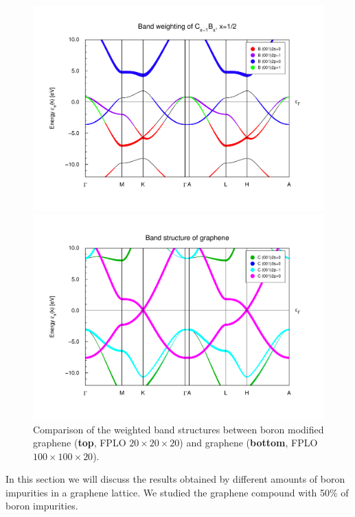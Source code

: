 				\begin{figure}
					\begin{minipage}[t]{\textwidth}
						\includegraphics[width=\textwidth]{Results/Bor/Bor1R/bweights.pdf}
					\end{minipage}
					\begin{minipage}[t]{\textwidth}
						\includegraphics[width=\textwidth]{Results/Graphene/GrapheneNew/bweights.pdf}
					\end{minipage}
					\caption{Comparison of the weighted band structures between boron modified graphene (\textbf{top}, FPLO $20\times20\times20$) and graphene (\textbf{bottom}, FPLO $100\times100\times20$). }
					\label{fig:GrapheneBorBweightsComparisson}
				\end{figure}
				In this section we will discuss the results obtained by different amounts of boron impurities in a graphene lattice. We studied the graphene compound with 50\% of boron impurities. \\\\
